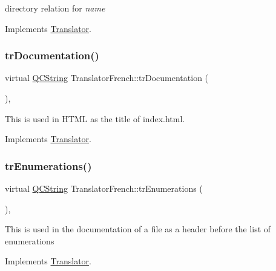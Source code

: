 directory relation for {\itshape name} 

Implements \mbox{\hyperlink{class_translator}{Translator}}.

\mbox{\label{class_translator_french_ad33761e9978b40043257606cfa5e6834}} 
\subsubsection{\texorpdfstring{trDocumentation()}{trDocumentation()}}
{\footnotesize\ttfamily virtual \mbox{\hyperlink{class_q_c_string}{Q\+C\+String}} Translator\+French\+::tr\+Documentation (\begin{DoxyParamCaption}{ }\end{DoxyParamCaption})\hspace{0.3cm}{\ttfamily [inline]}, {\ttfamily [virtual]}}

This is used in H\+T\+ML as the title of index.\+html. 

Implements \mbox{\hyperlink{class_translator}{Translator}}.

\mbox{\label{class_translator_french_a98abd3d8294a2596c41b9b3e71b11e3c}} 
\subsubsection{\texorpdfstring{trEnumerations()}{trEnumerations()}}
{\footnotesize\ttfamily virtual \mbox{\hyperlink{class_q_c_string}{Q\+C\+String}} Translator\+French\+::tr\+Enumerations (\begin{DoxyParamCaption}{ }\end{DoxyParamCaption})\hspace{0.3cm}{\ttfamily [inline]}, {\ttfamily [virtual]}}

This is used in the documentation of a file as a header before the list of enumerations 

Implements \mbox{\hyperlink{class_translator}{Translator}}.

\mbox{\label{class_translator_french_ad7b2db4ecd9157baa8731975d40f8b84}} 
